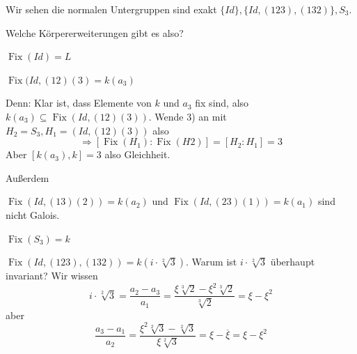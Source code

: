 \documentclass[a4paper,12pt,numbers=noenddot,parskip=full]{scrartcl}
\theoremstyle{dotless}
\theoremstyle{remark}
\begin{document}
	Wir sehen die normalen Untergruppen sind exakt $\{ Id \}, \{ Id, (123), (132) \}, S_3$.
	
	Welche Körpererweiterungen gibt es also?
	
	$\operatorname{Fix}(Id) = L$
	
	$\operatorname{Fix}(Id, (12)(3) = k(a_3)$
	
	Denn: Klar ist, dass Elemente von $k$ und $a_3$ fix sind, also $k(a_3) \subseteq \operatorname{Fix}(Id, (12)(3))$. Wende 3) an mit $H_2 = S_3, H_1 = (Id, (12)(3))$ also
	\begin{equation*}
		\Rightarrow [\operatorname{Fix}(H_1): \operatorname{Fix}(H2)] = [H_2: H_1] = 3
	\end{equation*}
	Aber $[k(a_3), k] = 3$ also Gleichheit.
	
	Außerdem
	
	$\operatorname{Fix}(Id, (13)(2)) = k(a_2)$ und $\operatorname{Fix}(Id, (23)(1)) = k(a_1)$ sind nicht Galois.
	
	$\operatorname{Fix}(S_3) = k$
	
	$\operatorname{Fix}(Id, (123), (132)) = k(i \cdot \sqrt[2]{3})$. Warum ist $i \cdot \sqrt[2]{3}$ überhaupt invariant? Wir wissen
	\begin{equation*}
		i \cdot \sqrt[2]{3} = \frac{a_2 - a_3}{a_1} = \frac{\xi \sqrt[3]{2} - \xi^2 \sqrt[3]{2}}{\sqrt[3]{2}} = \xi - \xi^2
	\end{equation*}
	aber
	\begin{equation*}
		\frac{a_3 - a_1}{a_2} = \frac{\xi^2 \sqrt[2]{3} - \sqrt[2]{3}}{\xi \sqrt[2]{3}} = \xi - \overline{\xi} = \xi - \xi^2
	\end{equation*}
	
\end{document}

